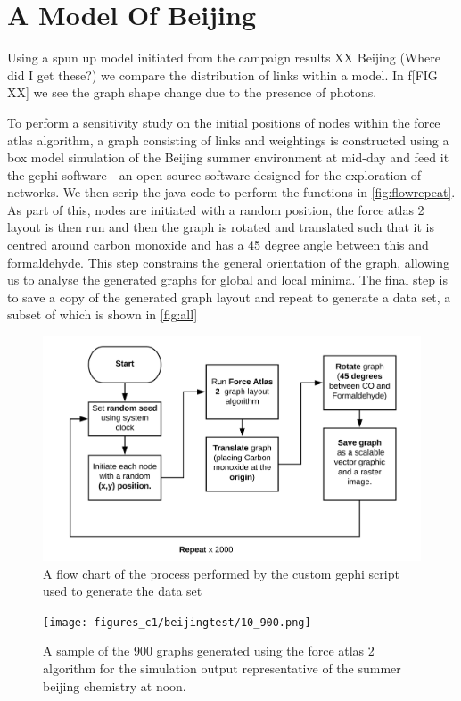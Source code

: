 \section{A Model Of Beijing}
Using a spun up model initiated from the campaign results XX Beijing (Where did I get these?) we compare the distribution of links within a model. In f[FIG XX] we see the graph shape change due to the presence of photons. 


To perform a sensitivity study on the initial positions of nodes within the force atlas algorithm, a graph consisting of links and weightings is constructed using a box model simulation of the Beijing summer environment at mid-day and feed it the gephi software \citep{gephi} - an open source software designed for the exploration of networks. We then scrip the java code to perform the functions in \autoref{fig:flowrepeat}. As part of this, nodes are initiated with a random position, the force atlas 2 layout is then run and then the graph is rotated and translated such that it is centred around carbon monoxide and has a 45 degree angle between this and formaldehyde. This step constrains the general orientation of the graph, allowing us to analyse the generated graphs for global and local minima. The final step is to save a copy of the generated graph layout and repeat to generate a data set, a subset of which is shown in  \autoref{fig:all}

    \begin{figure}[H]
         \centering
     \includegraphics[width=\textwidth]{figures_c1/flowrepeat.png}
     \caption{ A flow chart of the process performed by the custom gephi script used to generate the data set}
     \label{fig:flowrepeat}
     \end{figure}
 
    \begin{figure}[H]
         \centering
     \texttt{[image: figures\_c1/beijingtest/10\_900.png]}
     \caption{A sample of the 900 graphs generated using the force atlas 2 algorithm for the simulation output representative of the summer beijing chemistry at noon.  }
     \label{fig:all}
     \end{figure}
 

